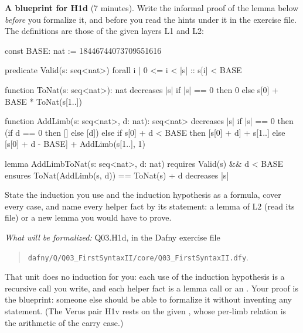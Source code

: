 \documentclass[11pt]{article}
\begin{document}
\begin{problem}\label{prob:B3}
\textbf{A blueprint for H1d} (7 minutes). Write the informal proof of the
lemma below \emph{before} you formalize it, and before you read the hints
under it in the exercise file. The definitions are those of the given layers
L1 and L2:
\begin{dafnycode}
const BASE: nat := 18446744073709551616

predicate Valid(s: seq<nat>)
{
  forall i | 0 <= i < |s| :: s[i] < BASE
}

function ToNat(s: seq<nat>): nat
  decreases |s|
{
  if |s| == 0 then 0 else s[0] + BASE * ToNat(s[1..])
}

function AddLimb(s: seq<nat>, d: nat): seq<nat>
  decreases |s|
{
  if |s| == 0 then (if d == 0 then [] else [d])
  else if s[0] + d < BASE then [s[0] + d] + s[1..]
  else [s[0] + d - BASE] + AddLimb(s[1..], 1)
}

lemma AddLimbToNat(s: seq<nat>, d: nat)
  requires Valid(s) && d < BASE
  ensures ToNat(AddLimb(s, d)) == ToNat(s) + d
  decreases |s|
\end{dafnycode}
State the induction you use and the induction hypothesis as a formula, cover
every case, and name every helper fact by its statement: a lemma of L2 (read
its file) or a new lemma you would have to prove.

\emph{What will be formalized:} Q03.H1d,  in the Dafny
exercise file
\begin{quote}
\texttt{dafny/Q/Q03\_FirstSyntaxII/core/Q03\_FirstSyntaxII.dfy}.
\end{quote}
\noindent That unit does
no induction for you: each use of the induction hypothesis is a recursive call
you write, and each helper fact is a lemma call or an . Your proof
is the blueprint: someone else should be able to formalize it without
inventing any statement. (The Verus pair H1v rests on the given
, whose per-limb relation is the arithmetic of the
carry case.)
\end{problem}
\end{document}
